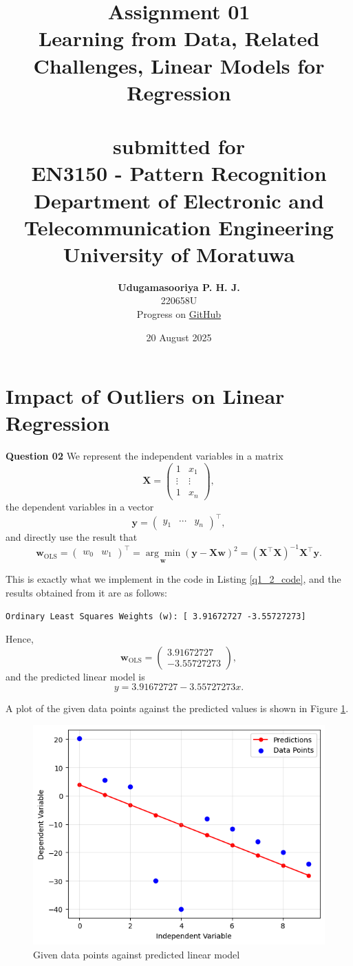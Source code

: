 \documentclass{article}[a4paper]
\title{
	\huge{\textbf{
		Assignment 01
	}}\\
	\Large{
		Learning from Data, Related Challenges, Linear Models for Regression
	}\\
	\large{\phantom{}}\\
	\large{
		submitted for
	}\\
	\LARGE{
		\textbf{EN3150 - Pattern Recognition}
	}\\
	\large{
		Department of Electronic and Telecommunication Engineering
	}
	\\
	\large{University of Moratuwa}
}
\author{
	\textbf{Udugamasooriya P. H. J.}\\
	220658U\\
	\small{Progress on \href{https://github.com/pulasthi-u/en3150-assignment01}{GitHub \extlink}}
}
\date{20 August 2025}
\begin{document}
	\maketitle

	\section{Impact of Outliers on Linear Regression}

	\textbf{Question 02}
	We represent the independent variables in a matrix \[
		\mathbf{X} = \begin{pmatrix}
			1		& x_1		\\
			\vdots	& \vdots	\\
			1		& x_n
		\end{pmatrix},
	\] the dependent variables in a vector \[
		\mathbf{y} = \begin{pmatrix}
			y_1 & \cdots & y_n
		\end{pmatrix} ^ \top,
	\] and directly use the result that \[
		\mathbf{w}_\text{OLS}
		= \begin{pmatrix} w_0 & w_1 \end{pmatrix} ^ \top
		= \underset{\mathbf{w}}{\arg\min} \left( \mathbf{y} - \mathbf{X} \mathbf{w} \right)^2
		= \left( \mathbf{X}^\top \mathbf{X} \right)^{-1} \mathbf{X}^\top \mathbf{y}.
	\]
	
	This is exactly what we implement in the code in Listing \ref{q1_2_code}, and the results obtained
	from it are as follows:
	\begin{verbatim}
Ordinary Least Squares Weights (w): [ 3.91672727 -3.55727273]
	\end{verbatim}

	Hence, \[
		\mathbf{w}_\text{OLS} = \begin{pmatrix} 3.91672727 \\ -3.55727273 \end{pmatrix},
	\] and the predicted linear model is \[
		y = 3.91672727 - 3.55727273 x.
	\]

	A plot of the given data points against the predicted values is shown in Figure \ref{q1_2_img}.

	\begin{figure}[H]
		\centering
		\includegraphics[width=0.9\linewidth]{images/q1_2.png}
		\caption{Given data points against predicted linear model}
		\label{q1_2_img}
	\end{figure}
\end{document}

